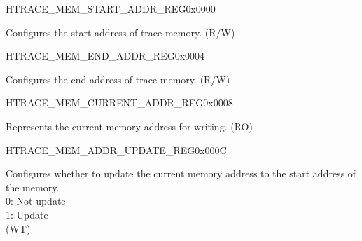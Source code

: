 \begin{register}{H}{TRACE\_MEM\_START\_ADDR\_REG}{0x0000}\label{regdesc:TRACEMEMSTARTADDRREG}
%
\regnewline%
\begin{regdesc}\begin{reglist}
\label{fielddesc:TRACEMEMSTARTADDR}\item [TRACE\_MEM\_START\_ADDR] Configures the start address of trace memory. (R/W)
\end{reglist}\end{regdesc}
\end{register}


\begin{register}{H}{TRACE\_MEM\_END\_ADDR\_REG}{0x0004}\label{regdesc:TRACEMEMENDADDRREG}
%
\regnewline%
\begin{regdesc}\begin{reglist}
\label{fielddesc:TRACEMEMENDADDR}\item [TRACE\_MEM\_END\_ADDR] Configures the end address of trace memory. (R/W)
\end{reglist}\end{regdesc}
\end{register}


\begin{register}{H}{TRACE\_MEM\_CURRENT\_ADDR\_REG}{0x0008}\label{regdesc:TRACEMEMCURRENTADDRREG}
%
\regnewline%
\begin{regdesc}\begin{reglist}
\label{fielddesc:TRACEMEMCURRENTADDR}\item [TRACE\_MEM\_CURRENT\_ADDR] Represents the current memory address for writing. (RO)
\end{reglist}\end{regdesc}
\end{register}


\begin{register}{H}{TRACE\_MEM\_ADDR\_UPDATE\_REG}{0x000C}\label{regdesc:TRACEMEMADDRUPDATEREG}
%
%
\regnewline%
\begin{regdesc}\begin{reglist}
\label{fielddesc:TRACEMEMCURRENTADDRUPDATE}\item [TRACE\_MEM\_CURRENT\_ADDR\_UPDATE] Configures whether to update the current memory address to the start address of the memory.\\
0: Not update\\
1: Update\\(WT)
\end{reglist}\end{regdesc}
\end{register}


